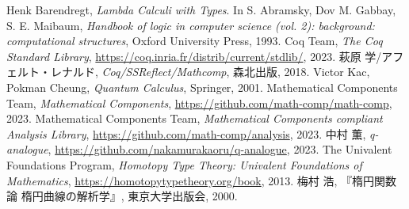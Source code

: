 \documentclass[11pt]{jsreport}
\theoremstyle{mystyle}
\newcommand{\0}{\textbf{0}}
\begin{document}
\begin{thebibliography}{9}
   Henk Barendregt, {\it Lambda Calculi with Types}.  
    In S. Abramsky, Dov M. Gabbay, S. E. Maibaum, 
    {\it Handbook of logic in computer science (vol. 2): background:
     computational structures}, Oxford University Press, 1993.
   Coq Team, {\it The Coq Standard Library}, 
  \url{https://coq.inria.fr/distrib/current/stdlib/}, 2023.
   萩原 学/アフェルト・レナルド, {\it Coq/SSReflect/Mathcomp}, 森北出版, 
    2018.
   Victor Kac, Pokman Cheung, {\it{Quantum Calculus}}, Springer, 2001.
   Mathematical Components Team, {\it Mathematical Components}, \url{https://github.com/math-comp/math-comp}, 2023.
   Mathematical Components Team, 
  {\it Mathematical Components compliant Analysis Library}, 
  \url{https://github.com/math-comp/analysis}, 2023.
   中村 薫, {\it q-analogue}, \url{https://github.com/nakamurakaoru/q-analogue}, 2023.
   The Univalent Foundations Program, 
                      {\it{Homotopy Type Theory: Univalent Foundations of Mathematics}}, 
                      \url{https://homotopytypetheory.org/book}, 2013.
   梅村 浩, 『楕円関数論  楕円曲線の解析学』, 東京大学出版会, 2000.
\end{thebibliography}
\end{document}
